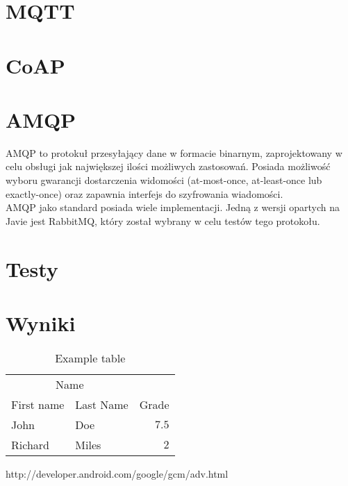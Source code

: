 \documentclass[twoside]{article}
\begin{document}
\begin{multicols}{2}
\section{MQTT}

\section{CoAP}

\section{AMQP}
AMQP to protokuł przesyłający dane w formacie binarnym, zaprojektowany w celu obsługi jak największej ilości możliwych zastosowań. Posiada możliwość wyboru gwarancji dostarczenia widomości (at-most-once, at-least-once lub exactly-once) oraz zapawnia interfejs do szyfrowania wiadomości.
\\ AMQP jako standard posiada wiele implementacji. Jedną z wersji opartych na Javie jest RabbitMQ, który został wybrany w celu testów tego protokołu.

\section{Testy}

\section{Wyniki}
\begin{table}[H]
\caption{Example table}
\centering
\begin{tabular}{llr}
\toprule
\multicolumn{2}{c}{Name} \\
\cmidrule(r){1-2}
First name & Last Name & Grade \\
\midrule
John & Doe & $7.5$ \\
Richard & Miles & $2$ \\
\bottomrule
\end{tabular}
\end{table}


\begin{thebibliography}{99} %

http://developer.android.com/google/gcm/adv.html
 
\end{thebibliography}


\end{multicols}
\end{document}
